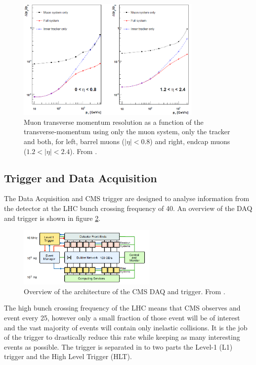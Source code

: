 \begin{figure}[htb!]
  \centering
  \includegraphics[width=0.8\textwidth]{MS}
  \caption{Muon transverse momentum resolution as a function of the
  \label{fig:MS}
transverse-momentum using only the muon system, only the tracker and both, for
left, barrel muons ($|\eta| < 0.8$) and right, endcap muons ($1.2<|\eta| <
2.4$). From \cite{cms}.}
\end{figure}


\subsection{Trigger and Data Acquisition}
The Data Acquisition and CMS trigger are designed to analyse information from
the detector at the LHC bunch crossing frequency of
\unit{40}{\mega\hertz}\cite{lhc}.
An overview of the DAQ and trigger is shown in figure \ref{fig:CMSDAQ}.

\begin{figure}[htb!]
  \centering
  \includegraphics[width=0.6\textwidth]{CMSDAQ}
  \caption{Overview of the architecture of the CMS DAQ and trigger. From
  \label{fig:CMSDAQ}
\cite{cms}.}
\end{figure}

The high bunch crossing frequency of the LHC means that CMS observes and event
every \unit{25}{\nano\second}, however only a small fraction of those event
will be of interest and the vast majority of events will contain only inelastic
collisions.
It is the job of the trigger to drastically reduce this rate while keeping as
many interesting events as possible.
The trigger is separated in to two parts the Level-1 (L1) trigger and the High
Level Trigger (HLT).\cite{cms}

